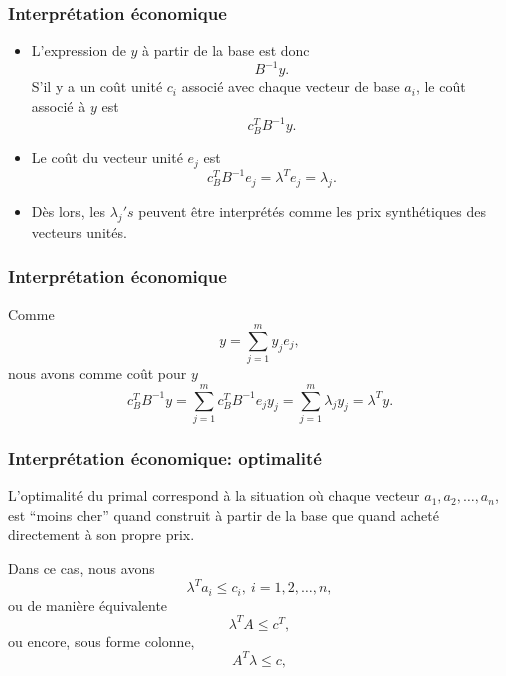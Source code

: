 \documentclass[usepdftitle=false]{beamer}
\begin{document}
\begin{frame}
	\frametitle{Interprétation économique}
	

\begin{itemize}
	\item 
	L'expression de $y$ à partir de la base est donc
	\[
	B^{-1}y.
	\]
	S'il y a un coût unité $c_i$ associé avec chaque vecteur de base $a_i$, le coût associé à $y$ est
	\[
	c_B^T B^{-1}y.
	\]
	
	\item 
	Le coût du vecteur unité $e_j$ est
	$$
	c_B^T B^{-1} e_j = \lambda^T e_j = \lambda_j.
	$$

	\item 
	Dès lors, les $\lambda_j's$ peuvent être interprétés comme les prix synthétiques des vecteurs unités.
\end{itemize}	
	
\end{frame}

\begin{frame}
	\frametitle{Interprétation économique}
	
	Comme
	\[
	y = \sum_{j = 1}^m y_j e_j,
	\]
	nous avons comme coût pour $y$
	\[
	c_B^T B^{-1}y = \sum_{j = 1}^m c_B^T B^{-1} e_j y_j = \sum_{j = 1}^m \lambda_j y_j = \lambda^T y.
	\]
	
\end{frame}

\begin{frame}
	\frametitle{Interprétation économique: optimalité}
	
	L'optimalité du primal correspond à la situation où chaque vecteur $a_1, a_2,\ldots, a_n$, est ``moins cher'' quand construit à partir de la base que quand acheté directement à son propre prix.
	
	\mbox{}
	
	Dans ce cas, nous avons
	\[
	\lambda^T a_i \leq c_i,\ i = 1,2,\ldots,n,
	\]
	ou de manière équivalente
	\[
	\lambda^T A \leq c^T,
	\]
	ou encore, sous forme colonne,
	\[
	A^T\lambda \leq c,
	\]
	
\end{frame}


\end{document}
